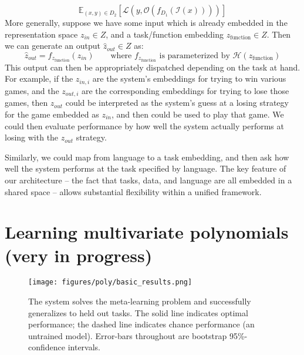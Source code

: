 \documentclass{article}
\begin{document}
\[\mathbb{E}_{(x, y)\in {D}_2} \left[ \mathcal{L}\left(y, \mathcal{O}\left(f_{D_1}\left(\mathcal{I} \left(x\right)\right) \right)\right)\right]\]
More generally, suppose we have some input which is already embedded in the representation space $z_{in} \in Z$, and a task/function embedding $z_{\text{function}} \in Z$. Then we can generate an output $\hat{z}_{out} \in Z$ as:  
\[\hat{z}_{out} = f_{z_{\text{function}}}(z_{in}) \qquad \text{where } f_{z_{\text{function}}} \text{ is parameterized by } \mathcal{H}\left(z_{\text{function}}\right)\]
This output can then be appropriately dispatched depending on the task at hand. For example, if the $z_{in,i}$ are the system's embeddings for trying to win various games, and the $z_{out,i}$ are the corresponding embeddings for trying to lose those games, then $z_{out}$ could be interpreted as the system's guess at a losing strategy for the game embedded as $z_{in}$, and then could be used to play that game. We could then evaluate performance by how well the system actually performs at losing with the $z_{out}$ strategy. \par
Similarly, we could map from language to a task embedding, and then ask how well the system performs at the task specified by language. The key feature of our architecture -- the fact that tasks, data, and language are all embedded in a shared space -- allows substantial flexibility within a unified framework. 

%
\section{Learning multivariate polynomials (very in progress)}
\begin{figure}
\centering
\texttt{[image: figures/poly/basic\_results.png]}
\caption{The system solves the meta-learning problem and successfully generalizes to held out tasks. The solid line indicates optimal performance; the dashed line indicates chance performance (an untrained model). Error-bars throughout are bootstrap 95\%-confidence intervals.}
\label{poly_basic_results}
\end{figure}
\end{document}
